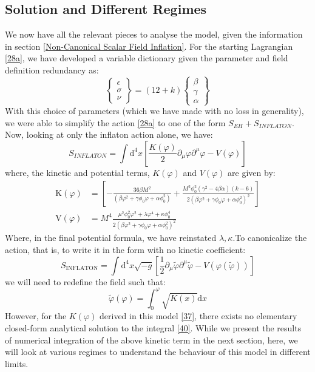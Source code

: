 \documentclass[aps,prd,reprint,preprintnumbers,showpacs,floatfix,nofootinbib,superscript address]{revtex4-2}
\begin{document}
\subsection{Solution and Different Regimes}
We now have all the relevant pieces to analyse the model, given the information in section \ref{Non-Canonical Scalar Field Inflation}. For the starting Lagrangian \ref{28a}, we have developed a variable dictionary given the parameter and field definition redundancy as:
\begin{equation} \label{35}
    \begin{Bmatrix}
        \epsilon \\ \sigma \\ \nu 
    \end{Bmatrix}
    = (12+k)
    \begin{Bmatrix}
        \beta \\ \gamma \\ \alpha
    \end{Bmatrix}
\end{equation}
With this choice of parameters (which we have made with no loss in generality), we were able to simplify the action \ref{28a} to one of the form $S_{EH} + S_{INFLATON}$. Now, looking at only the inflaton action alone, we have: 
\begin{equation}
    S_{INFLATON} = \int \text{d}^4x \left[ \frac{K(\varphi)}{2} \partial_\mu \varphi \partial^\mu \varphi - V(\varphi)\right]
\end{equation}
where, the kinetic and potential terms, $K(\varphi)$ and $V(\varphi)$ are given by:
\begin{align}
    \text{K}(\varphi) &= \left[-\frac{36 \beta M^2}{(\beta \varphi^2 + \gamma\phi_0\varphi + \alpha \phi_0^2)} + \frac{M^2 \phi_0^2 (\gamma^2 - 4\beta\alpha)(k-6)}{2 (\beta \varphi^2 + \gamma\phi_0\varphi + \alpha \phi_0^2)^2}\right] \label{37} \\
    \text{V}(\varphi) &= M^4  \frac{\mu^2 \phi^2_0 \varphi^2 + \lambda \varphi^4 + \kappa \phi_0^4}{2(\beta \varphi^2 + \gamma\phi_0\varphi + \alpha \phi_0^2)^2} \label{38}
\end{align}
Where, in the final potential formula, we have reinstated $\lambda, \kappa$.To canonicalize the action, that is, to write it in the form with no kinetic coefficient:
\begin{equation}
    S_{\text{INFLATON}} = \int \text{d}^4x \sqrt{-g} \left[ \frac{1}{2}\partial_\mu \tilde{\varphi}\partial^\mu \tilde{\varphi} - V(\varphi(\tilde{\varphi})) \right]
\end{equation}
we will need to redefine the field such that:
\begin{equation} \label{40}
    \tilde{\varphi}(\varphi) = \int_0^{\varphi} \sqrt{K(x)} \text{d}x
\end{equation}
However, for the $K(\varphi)$ derived in this model \ref{37}, there exists no elementary closed-form analytical solution to the integral \ref{40}. While we present the results of numerical integration of the above kinetic term in the next section, here, we will look at various regimes to understand the behaviour of this model in different limits. 
\end{document}

